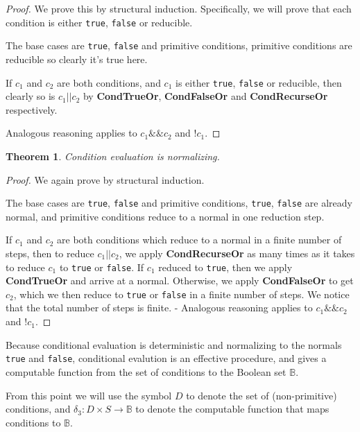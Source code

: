 \documentclass[11pt]{article}
\begin{document}
\begin{proof}
We prove this by structural induction.  Specifically, we will prove that each condition is either \texttt{true}, \texttt{false} or reducible.

The base cases are \texttt{true}, \texttt{false} and primitive conditions, primitive conditions are reducible so clearly it's true here.

If $c_{1}$ and $c_{2}$ are both conditions, and $c_{1}$ is either \texttt{true}, \texttt{false} or reducible, then clearly so is $c_{1}\texttt{||}c_{2}$ by \textbf{CondTrueOr}, \textbf{CondFalseOr} and \textbf{CondRecurseOr} respectively.

Analogous reasoning applies to $c_{1}\texttt{\&\&}c_{2}$ and $\texttt{!}c_{1}$.
\end{proof}

\newtheorem*{conditionalsnormalizing}{Theorem}
\begin{conditionalsnormalizing}
Condition evaluation is normalizing.
\end{conditionalsnormalizing}

\begin{proof}
We again prove by structural induction.

The base cases are \texttt{true}, \texttt{false} and primitive conditions, \texttt{true}, \texttt{false} are already normal, and primitive conditions reduce to a normal in one reduction step.

If $c_{1}$ and $c_{2}$ are both conditions which reduce to a normal in a finite number of steps, then to reduce $c_{1}\texttt{||}c_{2}$, we apply \textbf{CondRecurseOr} as many times as it takes to reduce $c_{1}$ to \texttt{true} or \texttt{false}.  If $c_{1}$ reduced to \texttt{true}, then we apply \textbf{CondTrueOr} and arrive at a normal.  Otherwise, we apply \textbf{CondFalseOr} to get $c_{2}$, which we then reduce to \texttt{true} or \texttt{false} in a finite number of steps.  We notice that the total number of steps is finite.
-
Analogous reasoning applies to $c_{1}\texttt{\&\&}c_{2}$ and $\texttt{!}c_{1}$.
\end{proof}

Because conditional evaluation is deterministic and normalizing to the normals \texttt{true} and \texttt{false}, conditional evalution is an effective procedure, and gives a computable function from the set of conditions to the Boolean set $\mathbb{B}$.

From this point we will use the symbol $D$ to denote the set of (non-primitive) conditions, and $\delta_{3} : D \times S \rightarrow \mathbb{B}$ to denote the computable function that maps conditions to $\mathbb{B}$.
\end{document}
